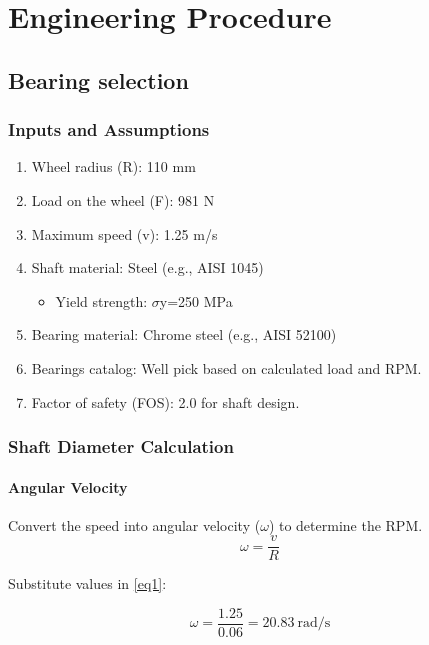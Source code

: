 \documentclass[../../main]{subfiles}
\begin{document}
\section{Engineering Procedure}

\subsection{Bearing selection}

\subsubsection{Inputs and Assumptions}

\begin{enumerate}
\def\labelenumi{\arabic{enumi}.}
\item
  Wheel radius (R): 110 mm
\item
  Load on the wheel (F): 981 N
\item
  Maximum speed (v): 1.25 m/s
\item
  Shaft material: Steel (e.g., AISI 1045)

  \begin{itemize}
  \item
    Yield strength: $\sigma$y=250 MPa
  \end{itemize}
\item
  Bearing material: Chrome steel (e.g., AISI 52100)
\item
  Bearings catalog: We\textquotesingle ll pick based on
  calculated load and RPM.
\item
  Factor of safety (FOS): 2.0 for shaft design.
\end{enumerate}

\subsubsection{ Shaft Diameter Calculation}

\paragraph{Angular Velocity}
Convert the speed into angular velocity ($\omega$) to determine the RPM.
\begin{equation}
\omega = \frac{v}{R}
\label{eq1} 
\end{equation}

Substitute values in \cref{eq1}:

$$\omega = \frac{1.25}{0.06} = 20.83  \ \text{rad/s}$$
\end{document}
